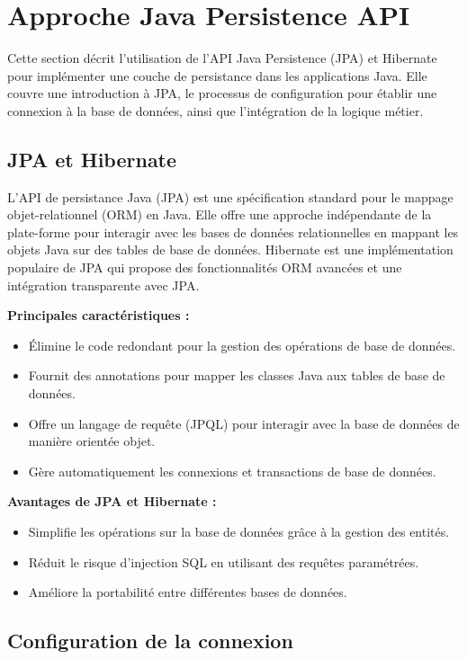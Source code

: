 \documentclass{article}
\begin{document}
\section{Approche Java Persistence API}

Cette section décrit l'utilisation de l'API Java Persistence (JPA) et Hibernate pour implémenter une couche de persistance dans les applications Java. Elle couvre une introduction à JPA, le processus de configuration pour établir une connexion à la base de données, ainsi que l'intégration de la logique métier.

\subsection{JPA et Hibernate}

L'API de persistance Java (JPA) est une spécification standard pour le mappage objet-relationnel (ORM) en Java. Elle offre une approche indépendante de la plate-forme pour interagir avec les bases de données relationnelles en mappant les objets Java sur des tables de base de données. Hibernate est une implémentation populaire de JPA qui propose des fonctionnalités ORM avancées et une intégration transparente avec JPA.

\textbf{Principales caractéristiques :}
\begin{itemize}
    \item Élimine le code redondant pour la gestion des opérations de base de données.
    \item Fournit des annotations pour mapper les classes Java aux tables de base de données.
    \item Offre un langage de requête (JPQL) pour interagir avec la base de données de manière orientée objet.
    \item Gère automatiquement les connexions et transactions de base de données.
\end{itemize}

\textbf{Avantages de JPA et Hibernate :}
\begin{itemize}
    \item Simplifie les opérations sur la base de données grâce à la gestion des entités.
    \item Réduit le risque d'injection SQL en utilisant des requêtes paramétrées.
    \item Améliore la portabilité entre différentes bases de données.
\end{itemize}

\subsection{Configuration de la connexion}
\end{document}
